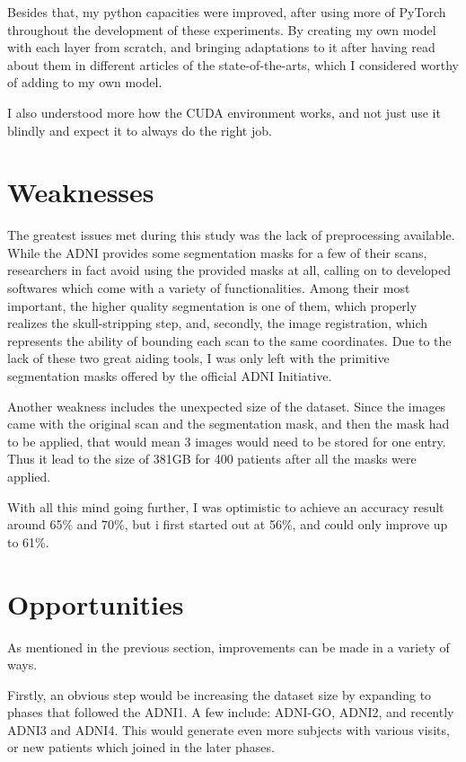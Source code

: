 \documentclass[a4paper]{article} %
\begin{document}
Besides that, my python capacities were improved, after using more of PyTorch throughout the development of these experiments. By creating my own
model with each layer from scratch, and bringing adaptations to it after having read about them in different articles of the state-of-the-arts, which
I considered worthy of adding to my own model.

I also understood more how the CUDA environment works, and not just use it blindly and expect it to always do the right job.

\section{Weaknesses}
The greatest issues met during this study was the lack of preprocessing available. While the ADNI provides some segmentation masks for a few of their scans,
researchers in fact avoid using the provided masks at all, calling on to developed softwares which come with a variety of functionalities. Among their most important,
the higher quality segmentation is one of them, which properly realizes the skull-stripping step, and, secondly, the image registration, which represents
the ability of bounding each scan to the same coordinates. Due to the lack of these two great aiding tools, I was only left with the primitive segmentation masks
offered by the official ADNI Initiative.

Another weakness includes the unexpected size of the dataset. Since the images came with the original scan and the segmentation mask, and then the mask had to be applied,
that would mean 3 images would need to be stored for one entry. Thus it lead to the size of 381GB for 400 patients after all the masks were applied.

With all this mind going further, I was optimistic to achieve an accuracy result around 65\% and 70\%, but i first started out at 56\%, and could only improve
up to 61\%.

\section{Opportunities}
As mentioned in the previous section, improvements can be made in a variety of ways.

Firstly, an obvious step would be increasing the dataset size by expanding to phases that followed the ADNI1. A few include: ADNI-GO, ADNI2, and recently
ADNI3 and ADNI4. This would generate even more subjects with various visits, or new patients which joined in the later phases.
\end{document}
